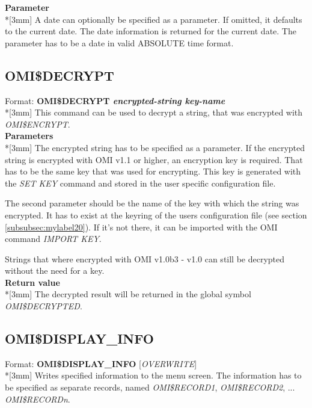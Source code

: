 \documentclass[a4paper]{book}
\newcommand{\vs}{\vspace{3mm}}
\renewcommand{\indent}{\hspace*{5mm}}
\begin{document}
\vs

\noindent\textbf{Parameter}\\*[3mm]
A date can optionally be specified as a parameter. If omitted, it defaults 
to the current date. The date information is returned for the current date. 
The parameter has to be a date in valid ABSOLUTE time format.

\subsection{OMI{\$}DECRYPT}
\label{subsubsec:mylabel50}

\indent Format: \textbf{OMI{\$}DECRYPT \textit{encrypted-string key-name}}\\*[3mm]
This command can be used to decrypt a string, that was encrypted with 
\linebreak\textsl{OMI{\$}ENCRYPT}.\\[3mm]
\textbf{Parameters}\\*[3mm]
The encrypted string has to be specified as a parameter. If the encrypted 
string is encrypted with OMI v1.1 or higher, an encryption key is required. 
That has to be the same key that was used for encrypting. This key is 
generated with the \textsl{SET KEY} command and stored in the user specific 
configuration file.

\vs

The second parameter should be the name of the key with which the string was 
encrypted. It has to exist at the keyring of the users configuration file 
(see section \ref{subsubsec:mylabel20}). If it's not there, it can be 
imported with the OMI command \textsl{IMPORT KEY}.

Strings that where encrypted with OMI v1.0b3 - v1.0 can still be decrypted 
without the need for a key.\\[3mm]
\textbf{Return value}\\*[3mm]
The decrypted result will be returned in the global symbol \textsl{OMI{\$}DECRYPTED}.

\subsection{OMI{\$}DISPLAY{\_}INFO}
\label{subsubsec:mylabel51}

\indent Format: \textbf{OMI{\$}DISPLAY{\_}INFO} [\textit{OVERWRITE}]\\*[3mm]
Writes specified information to the menu screen. The information has to be 
specified as separate records, named \textsl{OMI{\$}RECORD1}, \textsl{OMI{\$}RECORD2}, ... 
\textsl{OMI{\$}RECORD\textit{n}}.
\end{document}
